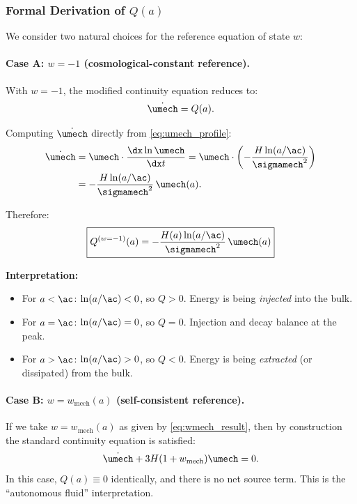 \subsubsection{Formal Derivation of $Q(a)$}

We consider two natural choices for the reference equation of state $w$:

\paragraph{Case A: $w = -1$ (cosmological-constant reference).}

With $w = -1$, the modified continuity equation reduces to:
\begin{equation}
\dot{\umech} = Q(a).
\end{equation}

Computing $\dot{\umech}$ directly from \eqref{eq:umech_profile}:
\begin{align}
\dot{\umech} &= \umech \cdot \frac{\dx \ln \umech}{\dx t} = \umech \cdot \left( -\frac{H\ln(a/\ac)}{\sigmamech^2} \right) \notag \\
&= -\frac{H\ln(a/\ac)}{\sigmamech^2} \, \umech(a).
\end{align}

Therefore:
\begin{equation}
\label{eq:Q_case_A}
\boxed{Q^{(w=-1)}(a) = -\frac{H(a)\ln(a/\ac)}{\sigmamech^2} \, \umech(a)}
\end{equation}

\textbf{Interpretation:}
\begin{itemize}
    \item For $a < \ac$: $\ln(a/\ac) < 0$, so $Q > 0$. Energy is being \emph{injected} into the bulk.
    \item For $a = \ac$: $\ln(a/\ac) = 0$, so $Q = 0$. Injection and decay balance at the peak.
    \item For $a > \ac$: $\ln(a/\ac) > 0$, so $Q < 0$. Energy is being \emph{extracted} (or dissipated) from the bulk.
\end{itemize}

\paragraph{Case B: $w = w_{\mathrm{mech}}(a)$ (self-consistent reference).}

If we take $w = w_{\mathrm{mech}}(a)$ as given by \eqref{eq:wmech_result}, then by construction the standard continuity equation is satisfied:
\begin{equation}
\dot{\umech} + 3H(1 + w_{\mathrm{mech}})\umech = 0.
\end{equation}
In this case, $Q(a) \equiv 0$ identically, and there is no net source term. This is the ``autonomous fluid'' interpretation.

